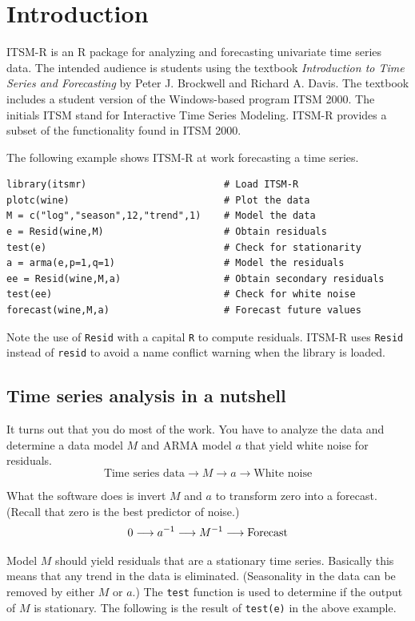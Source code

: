 \documentclass[12pt]{article}
\begin{document}
\renewcommand{\contentsname}{}
\tableofcontents

\newpage

\section{Introduction}
ITSM-R is an R package for analyzing and forecasting univariate
time series data.
The intended audience is students using the textbook
{\it Introduction to Time Series and Forecasting}
by Peter J. Brockwell and Richard A. Davis.
The textbook includes a student version of the Windows-based program ITSM 2000.
The initials ITSM stand for Interactive Time Series Modeling.
ITSM-R provides a subset of the functionality found in ITSM 2000.

\bigskip
The following example shows ITSM-R at work forecasting a time series.

\begin{verbatim}
library(itsmr)                        # Load ITSM-R
plotc(wine)                           # Plot the data
M = c("log","season",12,"trend",1)    # Model the data
e = Resid(wine,M)                     # Obtain residuals
test(e)                               # Check for stationarity
a = arma(e,p=1,q=1)                   # Model the residuals
ee = Resid(wine,M,a)                  # Obtain secondary residuals
test(ee)                              # Check for white noise
forecast(wine,M,a)                    # Forecast future values
\end{verbatim}

Note the use of {\tt Resid} with a capital {\tt R} to compute residuals.
ITSM-R uses {\tt Resid} instead of {\tt resid} to avoid a name conflict
warning when the library is loaded.

\subsection{Time series analysis in a nutshell}
It turns out that you do most of the work.
You have to analyze the data and
determine a data model $M$ and ARMA model $a$
that yield white noise for residuals.
\[
\text{Time series data}
\longrightarrow M\longrightarrow a\longrightarrow
\text{White noise}
\]

What the software does is invert $M$ and $a$ to transform zero into a forecast.
(Recall that zero is the best predictor of noise.)
\[
0\longrightarrow a^{-1}\longrightarrow M^{-1}\longrightarrow{\rm Forecast}
\]

Model $M$ should yield residuals that are a stationary time series.
Basically this means that any trend in the data is eliminated.
(Seasonality in the data can be removed by either $M$ or $a$.)
The {\tt test} function is used to determine if the output of $M$ is stationary.
The following is the result of {\tt test(e)} in the above example.
\end{document}
